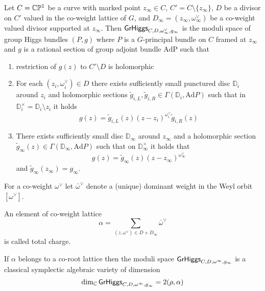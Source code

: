\documentclass[12pt,psamsfonts,reqno]{amsart}
\begin{document}
\begin{remark}
\begin{definition}
Let $C = \mathbb C \mathbb P^1$ be a curve
  with marked point $z_\infty \in C$, $C' = C \setminus \{z_\infty\}$, $D$ be
  a divisor on $C'$ valued in the co-weight lattice of $G$, and $D_{\infty} = (z_\infty, 
\omega_{\infty}^{\vee})$ be a co-weight valued divisor supported at $z_\infty$. Then $\mathsf{GrHiggs}_{C, D, \omega^{\vee}_\infty, g_\infty}$ is the moduli space of
  group Higgs bundles $(P, g)$ where $P$ is a $G$-principal bundle on $C$ framed at $z_\infty$
  and $g$ is a rational section of group adjoint bundle $\mathrm{Ad P}$ such that 
    \begin{enumerate}
    \item restriction of $g(z)$ to $C' \setminus {D}$ is holomorphic 
    \item For each $(z_{i}, \omega_{i}^{\vee}) \in D$ there exists sufficiently small
      punctured disc $\mathbb{D}_{i}$ around $z_{i}$ and holomorphic
      sections $\tilde g_{i,L},\tilde g_{i,R} \in \Gamma(\mathbb{D}_i, \mathrm{Ad} P)$ such
      that in $\mathbb{D}^{\times}_{i} = \mathbb{D}_{i} \setminus {z_{i}}$ it holds
      \begin{equation}
        g(z) =  \tilde g_{i,L}(z) (z-z_{i})^{\omega_{i}^\vee} \tilde g_{i,R}(z)
      \end{equation}
    \item There exists sufficiently small disc $\mathbb{D}_{\infty}$ around $z_\infty$
      and a holomorphic section $\tilde g_{\infty}(z) \in \Gamma(\mathbb{D}_\infty, \mathrm{Ad} P)$ such that
      on $\mathbb{D}_\infty^{\times}$ it holds that 
      \begin{equation}
        g(z) = \tilde g_\infty(z) (z - z_\infty)^{\omega_\infty^{\vee}}
      \end{equation}
      and $\tilde g_\infty(z_\infty) = g_\infty$. 
    \end{enumerate}
\end{definition}

For a co-weight $\omega^{\vee}$ let $\bar \omega^{\vee}$ denote
a (unique) dominant weight in the Weyl orbit $[\omega^{\vee}]$.


An element of co-weight lattice 
  \begin{equation}
   \alpha  =  \sum_{(z,\omega^{\vee}) \in D + D_\infty} \bar \omega^{\vee}
 \end{equation}
is called total charge. 
 
\begin{proposition}
If $\alpha$ belongs to a co-root lattice then the
 moduli space $\mathsf{GrHiggs}_{C,D,\omega^{\infty}, g_\infty}$ 
 is a classical symplectic algebraic variety of dimension
 \begin{equation}
   \dim_{\mathbb C} \mathsf{GrHiggs}_{C,D,\omega^{\infty}, g_\infty} = 2 ( \rho, \alpha)
 \end{equation}
\end{proposition}







\end{remark}
\end{document}
